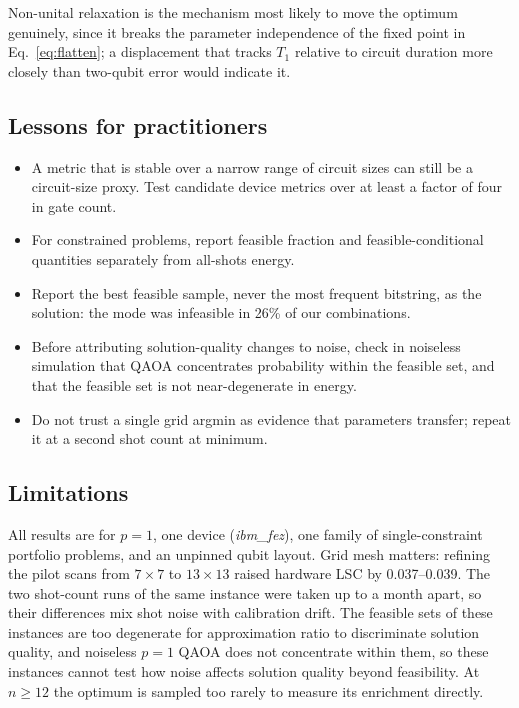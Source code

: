 \documentclass[conference]{IEEEtran}
\begin{document}
Non-unital relaxation is the mechanism most likely to move the optimum
genuinely, since it breaks the parameter independence of the fixed point
in Eq.~\eqref{eq:flatten}; a displacement that tracks $T_1$ relative to
circuit duration more closely than two-qubit error would indicate it.

\subsection{Lessons for practitioners}

\begin{itemize}
  \item A metric that is stable over a narrow range of circuit sizes
        can still be a circuit-size proxy. Test candidate device metrics
        over at least a factor of four in gate count.
  \item For constrained problems, report feasible fraction and
        feasible-conditional quantities separately from all-shots
        energy.
  \item Report the best feasible sample, never the most frequent
        bitstring, as the solution: the mode was infeasible in 26\% of
        our combinations.
  \item Before attributing solution-quality changes to noise, check in
        noiseless simulation that QAOA concentrates probability within
        the feasible set, and that the feasible set is not
        near-degenerate in energy.
  \item Do not trust a single grid argmin as evidence that parameters
        transfer; repeat it at a second shot count at minimum.
\end{itemize}

\subsection{Limitations}

All results are for $p{=}1$, one device (\textit{ibm\_fez}), one family
of single-constraint portfolio problems, and an unpinned qubit layout.
Grid mesh matters: refining the pilot scans from $7{\times}7$ to
$13{\times}13$ raised hardware LSC by 0.037--0.039. The two shot-count
runs of the same instance were taken up to a month apart, so their
differences mix shot noise with calibration drift. The feasible sets
of these instances are too degenerate for approximation ratio to
discriminate solution quality, and noiseless $p{=}1$ QAOA does not
concentrate within them, so these instances cannot test how noise
affects solution quality beyond feasibility. At $n{\ge}12$ the optimum
is sampled too rarely to measure its enrichment directly.
\end{document}
